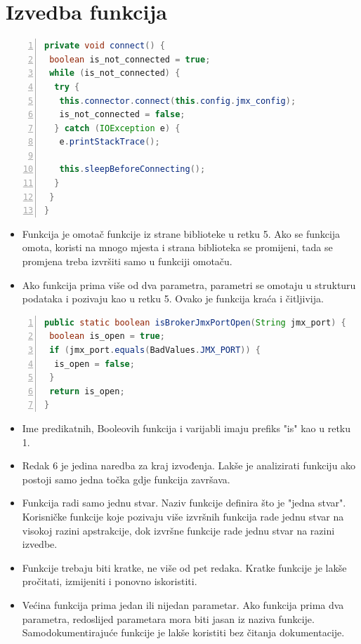 \documentclass[utf8, diplomski, lmodern, numeric]{fer}
\begin{document}
\section{Izvedba funkcija}

\begin{lstlisting}[floatplacement=H, language=Java, caption={Razred JMX Connector Facade}, captionpos=b, basicstyle=\footnotesize, numbers=left, stepnumber=1, backgroundcolor=\color{backcolour}, keywordstyle=\color{blue}]
private void connect() {
 boolean is_not_connected = true;
 while (is_not_connected) {
  try {
   this.connector.connect(this.config.jmx_config);
   is_not_connected = false;
  } catch (IOException e) {
   e.printStackTrace();
      
   this.sleepBeforeConnecting();
  }
 }
}
\end{lstlisting}

\begin{itemize}
    \item Funkcija je omotač funkcije iz strane biblioteke u retku 5. Ako se funkcija omota, koristi na mnogo mjesta i strana biblioteka se promijeni, tada se promjena treba izvršiti samo u funkciji omotaču.
    \item Ako funkcija prima više od dva parametra, parametri se omotaju u strukturu podataka i pozivaju kao u retku 5. Ovako je funkcija kraća i čitljivija.
\end{itemize}

\begin{lstlisting}[floatplacement=H, language=Java, caption={Predikatna funkcija}, captionpos=b, basicstyle=\footnotesize, numbers=left, stepnumber=1, backgroundcolor=\color{backcolour}, keywordstyle=\color{blue}]
public static boolean isBrokerJmxPortOpen(String jmx_port) {
 boolean is_open = true;
 if (jmx_port.equals(BadValues.JMX_PORT)) {
  is_open = false;
 }
 return is_open;
}
\end{lstlisting}

\begin{itemize}
    \item Ime predikatnih, Booleovih funkcija i varijabli imaju prefiks "is" kao u retku 1.
    \item Redak 6 je jedina naredba za kraj izvođenja. Lakše je analizirati funkciju ako postoji samo jedna točka gdje funkcija završava.
    \item Funkcija radi samo jednu stvar. Naziv funkcije definira što je "jedna stvar". Korisničke funkcije koje pozivaju više izvršnih funkcija rade jednu stvar na visokoj razini apstrakcije, dok izvršne funkcije rade jednu stvar na razini izvedbe.
    \item Funkcije trebaju biti kratke, ne više od pet redaka. Kratke funkcije je lakše pročitati, izmijeniti i ponovno iskoristiti.
    \item Većina funkcija prima jedan ili nijedan parametar. Ako funkcija prima dva parametra, redoslijed parametara mora biti jasan iz naziva funkcije. Samodokumentirajuće funkcije je lakše koristiti bez čitanja dokumentacije.
\end{itemize}
\end{document}
